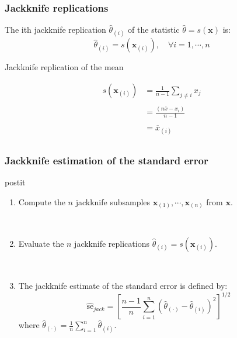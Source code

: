 \frame
{
\frametitle{Jackknife replications}

\begin{definition}
The ith \alert{jackknife replication} $\hat{\theta}_{(i)}$ of the statistic $\hat{\theta}=s(\mathbf{x})$ is:
$$ 
\hat{\theta}_{(i)}=s(\mathbf{x}_{(i)}),\quad \forall i=1,\cdots,n
$$
\end{definition}

\begin{exampleblock}{Jackknife replication of the mean}


$$
\begin{array}{ll}
s(\mathbf{x}_{(i)})&=\frac{1}{n-1}\sum_{j\neq i } x_j\\
&\\
&=\frac{(n\overline{x}-x_i)}{n-1} \\
&\\
&=\overline{x}_{(i)}\\
\end{array}
$$

\end{exampleblock}
}
\frame
{
\frametitle{Jackknife estimation of the standard error}


\begin{beamercolorbox}[wd=\linewidth, rounded=true,shadow=true]{postit}

\begin{enumerate}
\item Compute the $n$ jackknife subsamples $\mathbf{x}_{(1)}, \cdots,\mathbf{x}_{(n)}$ from $\mathbf{x}$.

\

\item Evaluate the $n$ jackknife replications $\hat{\theta}_{(i)}=s(\mathbf{x}_{(i)})$.

\

\item The \alert{jackknife estimate of the standard error} is defined by:
$$
\hat{\mathrm{se}}_{jack}=\left \lbrack \frac{n-1}{n} \sum_{i=1}^{n} (\hat{\theta}_{(\cdot)}-\hat{\theta}_{(i)})^{2}\right\rbrack^{1/2}
$$
where $\hat{\theta}_{(\cdot)}=\frac{1}{n}\sum_{i=1}^{n} \hat{\theta}_{(i)}$.

\end{enumerate}
\end{beamercolorbox}
}
\frame
